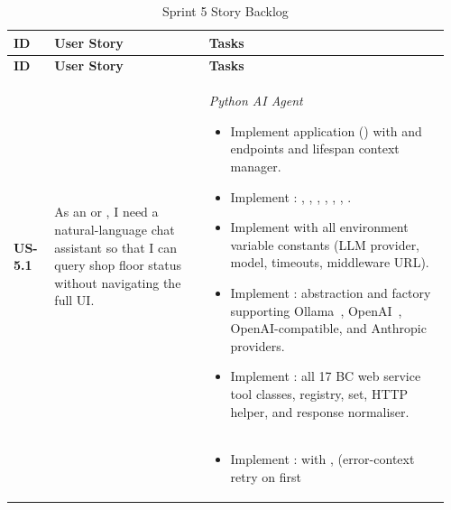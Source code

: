 \begin{longtable}{@{} P{0.09\linewidth} P{0.34\linewidth} P{0.53\linewidth} @{}}
	\caption{Sprint 5 Story Backlog}
	\label{tab:s5-sprint-backlog}\\
	\toprule
	\textbf{ID} & \textbf{User Story} & \textbf{Tasks} \\ 
	\midrule
	\endfirsthead
	\toprule
	\textbf{ID} & \textbf{User Story} & \textbf{Tasks} \\
	\midrule
	\endhead
	
	\bottomrule
	\endlastfoot

	\textbf{US-5.1}
	& As an  or , I need a
	natural-language chat assistant so that I can query shop floor 
	status without navigating the full UI.
	& \noindent\textit{Python AI Agent}
	\begin{itemize}[nosep, leftmargin=*]
		\item Implement  application () with
		       and  endpoints and lifespan context
		      manager.
		\item Implement : ,
		      , ,
		      , ,
		      , .
		\item Implement  with all environment variable
		      constants (LLM provider, model, timeouts, middleware URL).
		\item Implement : 
		      abstraction and  factory supporting
		      Ollama~\cite{ollama}, OpenAI~\cite{openai_api}, OpenAI-compatible, and Anthropic~\cite{anthropic} providers.
		\item Implement : all 17 BC web service tool
		      classes,  registry, 
		      set,  HTTP helper, and 
		      response normaliser.
	\end{itemize} \\ & &
	\begin{itemize}[nosep, leftmargin=*]
		\item Implement :
           with ,
           (error-context retry on first

\end{itemize}
\end{longtable}
